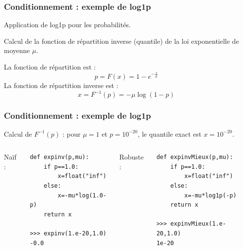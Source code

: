 \documentclass{beamer}
\begin{document}

\begin{frame}[containsverbatim]
\frametitle{Conditionnement : exemple de log1p}

Application de log1p pour les probabilités.

Calcul de la fonction de répartition inverse (quantile) de la 
loi exponentielle de moyenne $\mu$.

La fonction de répartition est :
$$
p=F(x) = 1-e^{-\frac{x}{\mu}}
$$
La fonction de répartition inverse est :
$$
x = F^{-1}(p)=-\mu\log(1-p)
$$

\end{frame}

\begin{frame}[containsverbatim]
\frametitle{Conditionnement : exemple de log1p}

Calcul de $F^{-1}(p)$ : pour $\mu=1$ et $p=10^{-20}$, le quantile exact est $x=10^{-20}$. 

  \begin{columns}
Naïf :
\begin{lstlisting}
def expinv(p,mu):
    if p==1.0:
        x=float("inf")
    else:
        x=-mu*log(1.0-p)
    return x

>>> expinv(1.e-20,1.0)
-0.0
\end{lstlisting}


Robuste :
\begin{lstlisting}
def expinvMieux(p,mu):
    if p==1.0:
        x=float("inf")
    else:
        x=-mu*log1p(-p)
    return x

>>> expinvMieux(1.e-20,1.0) 
1e-20
\end{lstlisting}

  \end{columns}

\end{frame}
\end{document}
